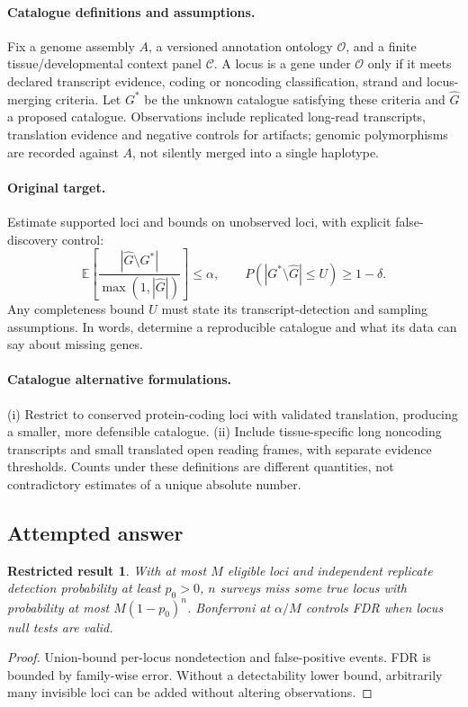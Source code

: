 \documentclass[11pt]{article}
\newcommand{\E}{\mathbb E}
\providecommand{\E}{\mathbb E}
\newtheorem{attemptresult}{Restricted result}[section]
\begin{document}
\paragraph{Catalogue definitions and assumptions.}
Fix a genome assembly $A$, a versioned annotation ontology $\mathcal O$, and a finite tissue/developmental context panel $\mathcal C$. A locus is a gene under $\mathcal O$ only if it meets declared transcript evidence, coding or noncoding classification, strand and locus-merging criteria. Let $G^*$ be the unknown catalogue satisfying these criteria and $\widehat G$ a proposed catalogue. Observations include replicated long-read transcripts, translation evidence and negative controls for artifacts; genomic polymorphisms are recorded against $A$, not silently merged into a single haplotype.
\paragraph{Original target.}
Estimate supported loci and bounds on unobserved loci, with explicit false-discovery control:
\[
\E\!\left[\frac{|\widehat G\setminus G^*|}{\max(1,|\widehat G|)}\right]\leq\alpha,
\qquad P(|G^*\setminus\widehat G|\leq U)\geq1-\delta.
\]
Any completeness bound $U$ must state its transcript-detection and sampling assumptions. In words, determine a reproducible catalogue and what its data can say about missing genes.
\paragraph{Catalogue alternative formulations.}
(i) Restrict to conserved protein-coding loci with validated translation, producing a smaller, more defensible catalogue. (ii) Include tissue-specific long noncoding transcripts and small translated open reading frames, with separate evidence thresholds. Counts under these definitions are different quantities, not contradictory estimates of a unique absolute number.
\subsection{Attempted answer}
\begin{attemptresult}
With at most $M$ eligible loci and independent replicate detection probability at least $p_0>0$, $n$ surveys miss some true locus with probability at most $M(1-p_0)^n$. Bonferroni at $\alpha/M$ controls FDR when locus null tests are valid.
\end{attemptresult}
\begin{proof}
Union-bound per-locus nondetection and false-positive events. FDR is bounded by family-wise error. Without a detectability lower bound, arbitrarily many invisible loci can be added without altering observations.
\end{proof}
\end{document}

